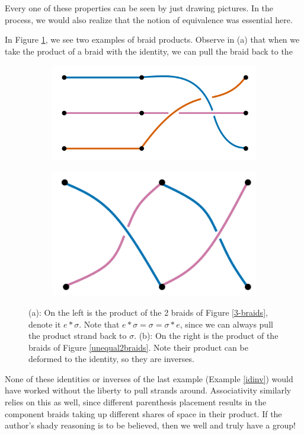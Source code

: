 \documentclass{amsart}
\begin{document}
Every one of these properties can be seen by just drawing pictures. In the
process, we would also realize that the notion of equivalence was essential
here.
\begin{example}\label{idinv}
   In Figure \ref{productbraids}, we see two examples of braid products.
	Observe in (a) that when we take the product of a braid with the identity,
	we can pull the braid back to the 
	\begin{figure}[h!]
		\begin{subfigure}{.575\textwidth}
			\centering
			\includegraphics[width=.9\linewidth]{Inkscape Files/productbraid2.png}
		\end{subfigure}%
		\begin{subfigure}{.425\textwidth}
			\centering
			\includegraphics[width=.9\linewidth]{Inkscape Files/braidsum.png}
		\end{subfigure}
		\caption{(a): On the left is the product of the 2 braids of Figure
		\ref{3-braids}, denote it \(e\ast\sigma\). Note that \(e\ast\sigma =
		\sigma = \sigma\ast e\), since we can always pull the product strand back to
		\(\sigma\). (b): On the
		right is the product of the braids of Figure \ref{unequal2braids}. Note
		their product can be deformed to the identity, so they are inverses.}
		\label{productbraids}
	\end{figure}
\end{example}
None of these identities or inverses of the last example (Example \ref{idinv})
would have worked without the liberty to
pull strands around. Associativity similarly relies on this as well, since
different parenthesis placement results in the component braids taking up
different shares of space in their product. If the author's shady reasoning is
to be believed, then we well and truly have a group!
\end{document}
